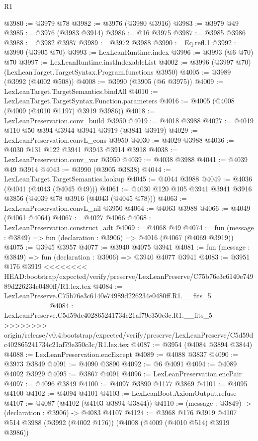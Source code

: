 \begin{lexlean}{R1}
\begin{coremodule}
{{{{{{{{{{{{{{{{{{{{{{{{{{{{{{{{{{{{{{{{{{{{{{{{{{{{{{{{{{{{{{{{{{{{{{{{{{{{{{{{{{{{{{{{{{{{{{{{{{{{{{{{{{{{{{{{{{{{{{{{{{{{{{{{{{{{{{{{{{{{{{{{{{{{{{{{{{{{{{{{{{{{{{{{{{{{{{{{{{{{{{{{{{@3980 := @3979 @78
@3982 := @3976 (@3980 @3916)
@3983 := @3979 @49
@3985 := @3976 (@3983 @3914)
@3986 := @16 @3975
@3987 := @3985 @3986
@3988 := @3982 @3987
@3989 := @3972 @3988
@3990 := Eq.refl.{1}
@3992 := @3990 (@3905 @70)
@3993 := LexLeanRuntime.index
@3996 := @3993 (@6 @70) @70
@3997 := LexLeanRuntime.instIndexableList
@4002 := @3996 (@3997 @70) (LexLeanTarget.TargetSyntax.Program.functions @3950)
@4005 := @3989 (@3992 (@4002 @508))
@4008 := @3990 (@3905 (@6 @3975))
@4009 := LexLeanTarget.TargetSemantics.bindAll
@4010 := LexLeanTarget.TargetSyntax.Function.parameters
@4016 := @4005 (@4008 (@4009 (@4010 @1197) @3919 @3986))
@4018 := LexLeanPreservation.conv_build @3950
@4019 := @4018 @3988
@4027 := @4019 @110 @50 @394 @3944 @3941 @3919 (@3841 @3919)
@4029 := LexLeanPreservation.convL_cons @3950
@4030 := @4029 @3988
@4036 := @4030 @131 @122 @3941 @3943 @3914 @3918
@4038 := LexLeanPreservation.conv_var @3950
@4039 := @4038 @3988
@4041 := @4039 @49 @3914
@4043 := @3990 (@3905 @3838)
@4044 := LexLeanTarget.TargetSemantics.lookup
@4045 := @4044 @3988
@4049 := @4036 (@4041 (@4043 (@4045 @49)))
@4061 := @4030 @120 @105 @3941 @3941 @3916 @3856 (@4039 @78 @3916 (@4043 (@4045 @78)))
@4063 := LexLeanPreservation.convL_nil @3950
@4064 := @4063 @3988
@4066 := @4049 (@4061 @4064)
@4067 := @4027 @4066
@4068 := LexLeanPreservation.construct_adt
@4069 := @4068 @49
@4074 := fun (message : @3849) => fun (declaration : @3906) => @4016 (@4067 (@4069 @3919))
@4075 := @3945 @3957
@4077 := @3940 @4075 @3941
@4081 := fun (message : @3849) => fun (declaration : @3906) => @3940 @4077 @3941
@4083 := @3951 @176 @3919
<<<<<<<< HEAD:bootstrap/expected/verify/preserve/LexLeanPreserve/C75b76e3c6140e74989d226234e0480ff/R1.lex.tex
@4084 := LexLeanPreserve.C75b76e3c6140e74989d226234e0480ff.R1.__fits_5
========
@4084 := LexLeanPreserve.C5d59dc402865241734c21af79e350c3c.R1.__fits_5
>>>>>>>> origin/release/v0.4:bootstrap/expected/verify/preserve/LexLeanPreserve/C5d59dc402865241734c21af79e350c3c/R1.lex.tex
@4087 := @3954 (@4084 @3894 @3844)
@4088 := LexLeanPreservation.encExcept
@4089 := @4088 @3837
@4090 := @3973 @3849
@4091 := @4090 @3890
@4092 := @6 @4091
@4094 := @4089 @4092 @3929
@4095 := @3867 @4091
@4096 := LexLeanPreservation.encPair
@4097 := @4096 @3849
@4100 := @4097 @3890 @1177 @3869
@4101 := @4095 @4100
@4102 := @4094 @4101
@4103 := LexLeanBoot.AxiomOutput.refuse
@4107 := @4087 (@4102 (@4103 @3894 @3844))
@4110 := (message : @3849) -> (declaration : @3906) -> @4083 @4107
@4124 := @3968
    @176
    @3919
    @4107
    @514
    @3988
    (@3992 (@4002 @176))
    (@4008 (@4009 (@4010 @514) @3919 @3986))
}}}}}}}}}}}}}}}}}}}}}}}}}}}}}}}}}}}}}}}}}}}}}}}}}}}}}}}}}}}}}}}}}}}}}}}}}}}}}}}}}}}}}}}}}}}}}}}}}}}}}}}}}}}}}}}}}}}}}}}}}}}}}}}}}}}}}}}}}}}}}}}}}}}}}}}}}}}}}}}}}}}}}}}}}}}}}}}}}}}}}}}}}}
\end{coremodule}
\end{lexlean}
